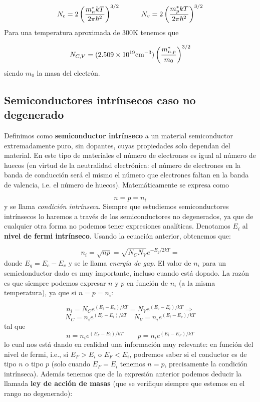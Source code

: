\begin{equation}
	N_c = 2 \left( \frac{m_n^* kT}{2\pi\hbar^2} \right)^{3/2} \quad \quad \quad
	N_v = 2 \left( \frac{m_p^* kT}{2\pi\hbar^2} \right)^{3/2}
\end{equation}
Para una temperatura aproximada de $300$K tenemos que

\begin{equation}
	N_{C,V} = (2.509\times10^{19} \text{cm}^{-3}) \left( \frac{m_{n,p}^*}{m_0} \right)^{3/2}
\end{equation}
siendo $m_0$ la masa del electrón.
\subsection{Semiconductores intrínsecos caso no degenerado}

Definimos como \textbf{semiconductor intrínseco} a un material semiconductor extremadamente puro, sin dopantes, cuyas propiedades solo dependan del material. En este tipo de materiales el número de electrones es igual al número de huecos (en virtud de la neutralidad electrónica: el número de electrones en la banda de conducción será el mismo el número que electrones faltan en la banda de valencia, i.e. el número de huecos). Matemáticamente se expresa como

\begin{equation}
	n = p = n_i
\end{equation}
y se llama \textit{condición intrínseca}. Siempre que estudiemos semiconductores intrínsecos lo haremos a través de los semiconductores no degenerados, ya que de cualquier otra forma no podemos tener expresiones analíticas. Denotamos $E_i$ al \textbf{nivel de fermi intrínseco}. Usando la ecuación anterior, obtenemos que:

\begin{equation}
	n_i = \sqrt{np} = \sqrt{N_CN_V} e^{-E_g/2kT} =
\end{equation}
donde $E_g=E_c-E_v$ y se le llama \textit{energía de gap}. El valor de $n_i$ para un semicdonductor dado es muy importante, incluso cuando está dopado. La razón es que siempre podemos expresar $n$ y $p$  en función de $n_i$ (a la misma temperatura), ya que si $n=p=n_i$:

\begin{equation*}
	n_i = N_C e^{(E_i-E_c)/kT} = N_V e^{(E_v-E_i)/kT}  \Rightarrow
\end{equation*}
\begin{equation}
	N_C=n_i e^{(E_c-E_i)/kT} \quad N_V = n_i e^{(E_i-E_v)/kT} \label{Ec:01-3-13}
\end{equation}
tal que
\begin{equation}
	n=n_i e^{(E_F-E_i)/kT} \qquad p = n_i e^{(E_i-E_F)/kT} \label{Ec:01-3-14}
\end{equation}
lo cual nos está dando en realidad una información muy relevante: en función del nivel de fermi, i.e., si $E_F>E_i$ o $E_F<E_i$, podremos saber si el conductor es de tipo $n$ o tipo $p$ (solo cuando $E_F=E_i$ tenemos $n=p$, precisamente la condición intrínseca). Además tenemos que de la expresión anterior podemos deducir la llamada \textbf{ley de acción de masas} (que se verifique siempre que estemos en el rango no degenerado):

